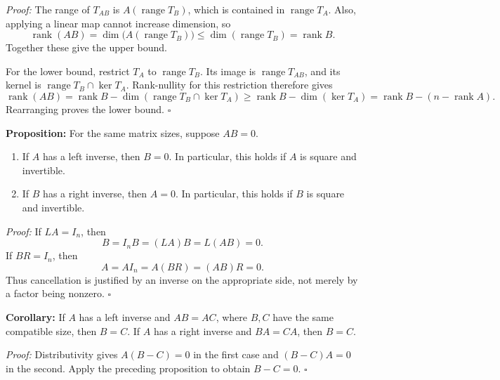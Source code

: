 \documentclass[a4paper,11pt,abstract=true]{scrartcl}
\theoremstyle{dotlessP}
\theoremstyle{dotlessS}
\theoremstyle{remark}
\theoremstyle{definition}
\begin{document}
\begin{claim_box}
\textit{Proof:} The range of $T_{AB}$ is $A(\operatorname{range}T_B)$,
which is contained in $\operatorname{range}T_A$. Also, applying a linear
map cannot increase dimension, so
\[
\operatorname{rank}(AB)
=\dim\bigl(A(\operatorname{range}T_B)\bigr)
\leq\dim(\operatorname{range}T_B)=\operatorname{rank}B.
\]
Together these give the upper bound.

For the lower bound, restrict $T_A$ to $\operatorname{range}T_B$.
Its image is $\operatorname{range}T_{AB}$, and its kernel is
$\operatorname{range}T_B\cap\ker T_A$. Rank-nullity for this restriction
therefore gives
\[
\operatorname{rank}(AB)
=\operatorname{rank}B-
\dim(\operatorname{range}T_B\cap\ker T_A)
\geq\operatorname{rank}B-\dim(\ker T_A)
=\operatorname{rank}B-(n-\operatorname{rank}A).
\]
Rearranging proves the lower bound. \hfill$\square$
\end{claim_box}

\begin{problem_box}
\textbf{Proposition:} For the same
matrix sizes, suppose $AB=0$.
\begin{enumerate}
    \item If $A$ has a left inverse, then $B=0$.
    In particular, this holds if $A$ is square and invertible.
    \item If $B$ has a right inverse, then $A=0$.
    In particular, this holds if $B$ is square and invertible.
\end{enumerate}

\end{problem_box}

\begin{claim_box}
\textit{Proof:} If $LA=I_n$, then
\[
B=I_n B=(LA)B=L(AB)=0.
\]
If $BR=I_n$, then
\[
A=A I_n=A(BR)=(AB)R=0.
\]
Thus cancellation is justified by an inverse on the appropriate side,
not merely by a factor being nonzero. \hfill$\square$
\end{claim_box}

\begin{problem_box}
\textbf{Corollary:} If $A$ has a left inverse
and $AB=AC$, where $B,C$ have the same compatible size, then $B=C$.
If $A$ has a right inverse and $BA=CA$, then $B=C$.

\end{problem_box}

\begin{claim_box}
\textit{Proof:} Distributivity gives $A(B-C)=0$ in the first case
and $(B-C)A=0$ in the second. Apply the preceding proposition to
obtain $B-C=0$. \hfill$\square$
\end{claim_box}
\end{document}
